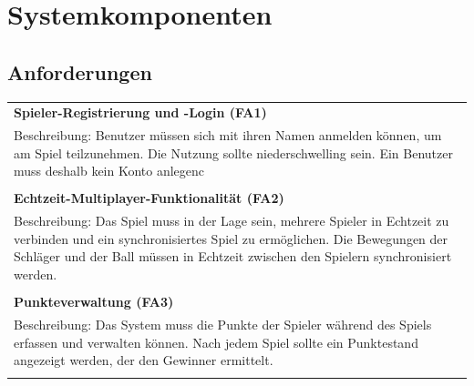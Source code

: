 \documentclass[
]{article}
\begin{document}
\section{Systemkomponenten}

\subsection{Anforderungen}
\begin{center}
  \begin{tabular}{|p{\linewidth}|}
    \hline
    \textbf{Spieler-Registrierung und -Login (FA1)} \\
    Beschreibung: Benutzer müssen sich mit ihren Namen anmelden können, um am Spiel teilzunehmen.
    Die Nutzung sollte niederschwelling sein. Ein Benutzer muss deshalb kein Konto anlegenc \\ \\
    \hline
    \textbf{Echtzeit-Multiplayer-Funktionalität (FA2)} \\
    Beschreibung: Das Spiel muss in der Lage sein, mehrere Spieler in Echtzeit zu verbinden und ein synchronisiertes Spiel zu ermöglichen. Die Bewegungen der Schläger und der Ball müssen in Echtzeit zwischen den Spielern synchronisiert werden.\\ \\
    \hline
    \textbf{Punkteverwaltung (FA3)} \\
    Beschreibung: Das System muss die Punkte der Spieler während des Spiels erfassen und verwalten können. Nach jedem Spiel sollte ein Punktestand angezeigt werden, der den Gewinner ermittelt. \\ \\
    \hline
  \end{tabular}
\end{center}
\end{document}
